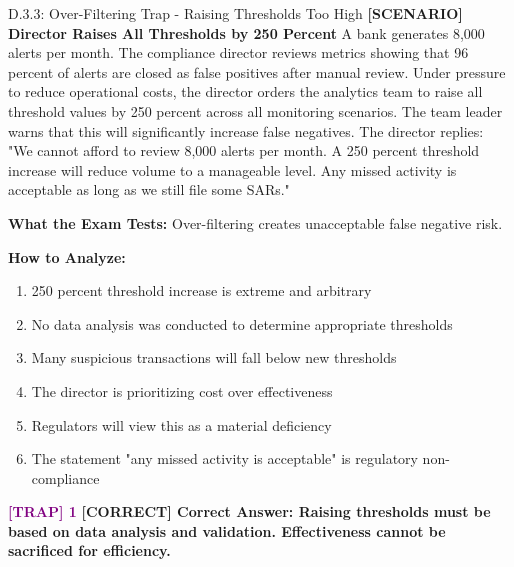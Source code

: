 \documentclass[11pt,a4paper]{beamer}
\newcommand{\trap}[1]{\textcolor{purple}{\textbf{[TRAP] 1}}}
\newcommand{\correct}[1]{\textcolor{green!50!black}{\textbf{[CORRECT] #1}}}
\newcommand{\scenario}[1]{\textcolor{blue!70!black}{\textbf{[SCENARIO] #1}}}
\begin{document}
\begin{frame}{D.3.3: Over-Filtering Trap - Raising Thresholds Too High}
	\scenario{Director Raises All Thresholds by 250 Percent}
	A bank generates 8,000 alerts per month. The compliance director reviews metrics showing that 96 percent of alerts are closed as false positives after manual review. Under pressure to reduce operational costs, the director orders the analytics team to raise all threshold values by 250 percent across all monitoring scenarios. The team leader warns that this will significantly increase false negatives. The director replies: "We cannot afford to review 8,000 alerts per month. A 250 percent threshold increase will reduce volume to a manageable level. Any missed activity is acceptable as long as we still file some SARs."
	
	\vspace{0.1cm}
	\textbf{What the Exam Tests:} Over-filtering creates unacceptable false negative risk.
	
	\vspace{0.1cm}
	\textbf{How to Analyze:}
	\begin{enumerate}
		\item 250 percent threshold increase is extreme and arbitrary
		\item No data analysis was conducted to determine appropriate thresholds
		\item Many suspicious transactions will fall below new thresholds
		\item The director is prioritizing cost over effectiveness
		\item Regulators will view this as a material deficiency
		\item The statement "any missed activity is acceptable" is regulatory non-compliance
	\end{enumerate}
	
	\trap{Common Distractor: "The director is correctly managing operational efficiency under the risk-based approach."}
	\correct{Correct Answer: Raising thresholds must be based on data analysis and validation. Effectiveness cannot be sacrificed for efficiency.}
\end{frame}
\end{document}
